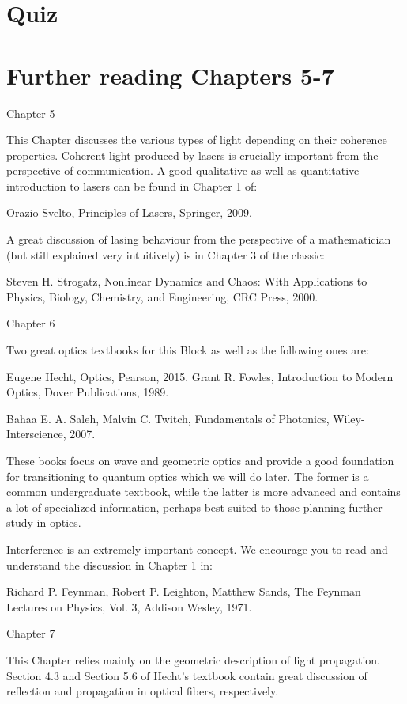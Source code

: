 \newpage
\section*{Quiz}

\section*{Further reading Chapters 5-7}

Chapter 5

This Chapter discusses the various types of light depending on their coherence properties. Coherent light produced by lasers is crucially important from the perspective of communication. A good qualitative as well as quantitative introduction to lasers can be found in Chapter 1 of:

Orazio Svelto, Principles of Lasers, Springer, 2009.

A great discussion of lasing behaviour from the perspective of a mathematician (but still explained very intuitively) is in Chapter 3 of the classic:

Steven H. Strogatz, Nonlinear Dynamics and Chaos: With Applications to Physics, Biology, Chemistry, and Engineering, CRC Press, 2000.

Chapter 6

Two great optics textbooks for this Block as well as the following ones are:

Eugene Hecht, Optics, Pearson, 2015.
Grant R. Fowles, Introduction to Modern Optics, Dover Publications, 1989.

Bahaa E. A. Saleh, Malvin C. Twitch, Fundamentals of Photonics, Wiley-Interscience, 2007.

These books focus on wave and geometric optics and provide a good foundation for transitioning to quantum optics which we will do later. The former is a common undergraduate textbook, while the latter is more advanced and contains a lot of specialized information, perhaps best suited to those planning further study in optics.

Interference is an extremely important concept. We encourage you to read and understand the discussion in Chapter 1 in:

Richard P. Feynman, Robert P. Leighton, Matthew Sands, The Feynman Lectures on Physics, Vol. 3, Addison Wesley, 1971.

Chapter 7

This Chapter relies mainly on the geometric description of light propagation. Section 4.3 and Section 5.6 of Hecht’s textbook contain great discussion of reflection and propagation in optical fibers, respectively.
